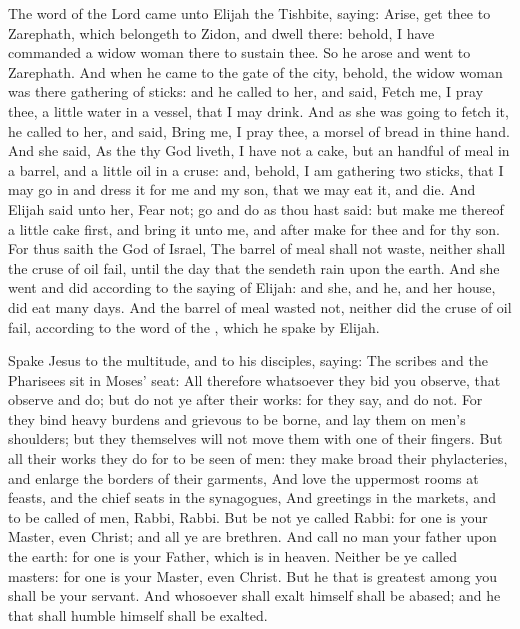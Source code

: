 \clearpage
{}
 The word of the Lord came unto Elijah the Tishbite, saying:  Arise, get thee to Zarephath, which belongeth to Zidon, and dwell there: behold, I have commanded a widow woman there to sustain thee. So he arose and went to Zarephath. And when he came to the gate of the city, behold, the widow woman was there gathering of sticks: and he called to her, and said, Fetch me, I pray thee, a little water in a vessel, that I may drink. And as she was going to fetch it, he called to her, and said, Bring me, I pray thee, a morsel of bread in thine hand. And she said, As the  thy God liveth, I have not a cake, but an handful of meal in a barrel, and a little oil in a cruse: and, behold, I am gathering two sticks, that I may go in and dress it for me and my son, that we may eat it, and die. And Elijah said unto her, Fear not; go and do as thou hast said: but make me thereof a little cake first, and bring it unto me, and after make for thee and for thy son. For thus saith the  God of Israel, The barrel of meal shall not waste, neither shall the cruse of oil fail, until the day that the  sendeth rain upon the earth. And she went and did according to the saying of Elijah: and she, and he, and her house, did eat many days. And the barrel of meal wasted not, neither did the cruse of oil fail, according to the word of the , which he spake by Elijah.


 Spake Jesus to the multitude, and to his disciples, saying: The scribes and the Pharisees sit in Moses' seat: All therefore whatsoever they bid you observe, that observe and do; but do not ye after their works: for they say, and do not. For they bind heavy burdens and grievous to be borne, and lay them on men's shoulders; but they themselves will not move them with one of their fingers. But all their works they do for to be seen of men: they make broad their phylacteries, and enlarge the borders of their garments, And love the uppermost rooms at feasts, and the chief seats in the synagogues, And greetings in the markets, and to be called of men, Rabbi, Rabbi. But be not ye called Rabbi: for one is your Master, even Christ; and all ye are brethren. And call no man your father upon the earth: for one is your Father, which is in heaven. Neither be ye called masters: for one is your Master, even Christ. But he that is greatest among you shall be your servant. And whosoever shall exalt himself shall be abased; and he that shall humble himself shall be exalted.

